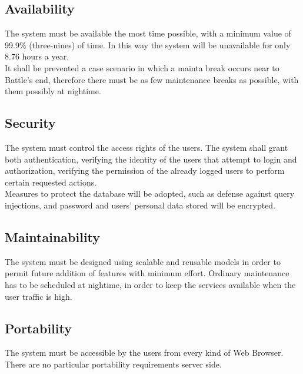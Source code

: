 \subsection{Availability}
\label{subsec:availability}%
The system must be available the most time possible, with a minimum value of 99.9\% (three-nines) of time. In this way the system will be unavailable for only 8.76 hours a year. \\
It shall be prevented a case scenario in which a mainta break occurs near to Battle's end, therefore there must be as few maintenance breaks as possible, with them possibly at nightime.

\subsection{Security}
\label{subsec:security}%
The system must control the access rights of the users. The system shall grant both authentication, verifying the identity of the users that attempt to login and authorization, verifying the permission of the already logged users to perform certain requested actions. \\
Measures to protect the database will be adopted, such as defense against query injections, and password and users' personal data stored will be encrypted.


\subsection{Maintainability}
\label{subsec:maintainability}%
The system must be designed using scalable and reusable models in order to permit future addition of features with minimum effort. 
Ordinary maintenance has to be scheduled at nightime, in order to keep the services available when the user traffic is high.

\subsection{Portability}
\label{subsec:portability}%
The system must be accessible by the users from every kind of Web Browser. 
There are no particular portability requirements server side.



